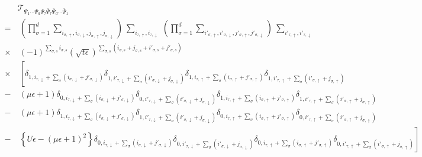 \documentclass[nofootinbib,prd,aps,superscriptaddress,preprintnumbers,twocolumn,showpacs]{revtex4-1}
\begin{document}
\begin{widetext}
\begin{align}
\label{eq:d+1_pre_gtensor}
	&\mathcal{T}_{\Psi_{1}\cdots\Psi_{d}\Psi_{\tau}\bar{\Psi}_{\tau}\bar{\Psi}_{d}\cdots\bar{\Psi}_{1}}\nonumber\\
	=&~\left(\prod_{\sigma=1}^{d}\sum_{i_{\sigma,\uparrow},i_{\sigma,\downarrow},j_{\sigma,\uparrow},j_{\sigma,\downarrow}}\right)~\sum_{i_{\tau,\uparrow},i_{\tau,\downarrow}}~\left(\prod_{\sigma=1}^{d}\sum_{i'_{\sigma,\uparrow},i'_{\sigma,\downarrow},j'_{\sigma,\uparrow},j'_{\sigma,\downarrow}}\right)~\sum_{i'_{\tau,\uparrow},i'_{\tau,\downarrow}}\nonumber\\
	\times&~(-1)^{\sum_{\sigma,s}i_{\sigma,s}}(\sqrt{t\epsilon})^{\sum_{\sigma,s}(i_{\sigma,s}+j_{\sigma,s}+i'_{\sigma,s}+j'_{\sigma,s})}\nonumber\\
	\times&~\left[\delta_{1,i_{\tau,\downarrow}+\sum_{\sigma}(i_{\sigma,\downarrow}+j'_{\sigma,\downarrow})}\delta_{1,i'_{\tau,\downarrow}+\sum_{\sigma}(i'_{\sigma,\downarrow}+j_{\sigma,\downarrow})}\delta_{1,i_{\tau,\uparrow}+\sum_{\sigma}(i_{\sigma,\uparrow}+j'_{\sigma,\uparrow})}\delta_{1,i'_{\tau,\uparrow}+\sum_{\sigma}(i'_{\sigma,\uparrow}+j_{\sigma,\uparrow})}\right.\nonumber\\
	-&~(\mu\epsilon+1)\delta_{0,i_{\tau,\downarrow}+\sum_{\sigma}(i_{\sigma,\downarrow}+j'_{\sigma,\downarrow})}\delta_{0,i'_{\tau,\downarrow}+\sum_{\sigma}(i'_{\sigma,\downarrow}+j_{\sigma,\downarrow})}\delta_{1,i_{\tau,\uparrow}+\sum_{\sigma}(i_{\sigma,\uparrow}+j'_{\sigma,\uparrow})}\delta_{1,i'_{\tau,\uparrow}+\sum_{\sigma}(i'_{\sigma,\uparrow}+j_{\sigma,\uparrow})}\nonumber\\
	-&~(\mu\epsilon+1)\delta_{1,i_{\tau,\downarrow}+\sum_{\sigma}(i_{\sigma,\downarrow}+j'_{\sigma,\downarrow})}\delta_{1,i'_{\tau,\downarrow}+\sum_{\sigma}(i'_{\sigma,\downarrow}+j_{\sigma,\downarrow})}\delta_{0,i_{\tau,\uparrow}+\sum_{\sigma}(i_{\sigma,\uparrow}+j'_{\sigma,\uparrow})}\delta_{0,i'_{\tau,\uparrow}+\sum_{\sigma}(i'_{\sigma,\uparrow}+j_{\sigma,\uparrow})}\nonumber\\
	-&~\left.\left\{U\epsilon-(\mu\epsilon+1)^{2}\right\}\delta_{0,i_{\tau,\downarrow}+\sum_{\sigma}(i_{\sigma,\downarrow}+j'_{\sigma,\downarrow})}\delta_{0,i'_{\tau,\downarrow}+\sum_{\sigma}(i'_{\sigma,\downarrow}+j_{\sigma,\downarrow})}\delta_{0,i_{\tau,\uparrow}+\sum_{\sigma}(i_{\sigma,\uparrow}+j'_{\sigma,\uparrow})}\delta_{0,i'_{\tau,\uparrow}+\sum_{\sigma}(i'_{\sigma,\uparrow}+j_{\sigma,\uparrow})}\right]\nonumber\\

\end{align}
\end{widetext}
\end{document}
